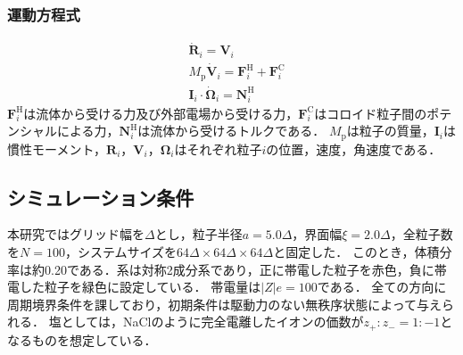 \subsubsection{運動方程式}
%
\vspace*{-2.5zh}
%
\begin{eqnarray}
	& \dot{\boldsymbol{R}}_i = \boldsymbol{V}_i\\
    & M_{\textrm{p}}\dot{\boldsymbol{V}}_i = \boldsymbol{F}^{\textrm{H}}_i + \boldsymbol{F}^{\textrm{C}}_i\\
	& \boldsymbol{I}_i \cdot \dot{\boldsymbol{\Omega}}_i=\boldsymbol{N}^{\textrm{H}}_i
\end{eqnarray}
%
$\boldsymbol{F}^{\textrm{H}}_i$は流体から受ける力及び外部電場から受ける力，$\boldsymbol{F}^{\textrm{C}}_i$はコロイド粒子間のポテンシャルによる力，$\boldsymbol{N}^{\textrm{H}}_i$は流体から受けるトルクである．
$M_{\textrm{p}}$は粒子の質量，$\boldsymbol{I}_i$は慣性モーメント，$\boldsymbol{R}_i$，$\boldsymbol{V}_i$，$\boldsymbol{\Omega}_i$はそれぞれ粒子$i$の位置，速度，角速度である．
%
\subsection{シミュレーション条件}
\par 本研究ではグリッド幅を$\Delta$とし，粒子半径$a=5.0\Delta$，界面幅$\xi=2.0\Delta$，全粒子数を$N=100$，システムサイズを$64\Delta\times64\Delta\times64\Delta$と固定した．
このとき，体積分率は約0.20である．系は対称2成分系であり，正に帯電した粒子を赤色，負に帯電した粒子を緑色に設定している．
帯電量は$|Z|e=100$である．
全ての方向に周期境界条件を課しており，初期条件は駆動力のない無秩序状態によって与えられる．
塩としては，NaClのように完全電離したイオンの価数が$z_+:z_- = 1:-1$となるものを想定している．
%	
\newpage
%
